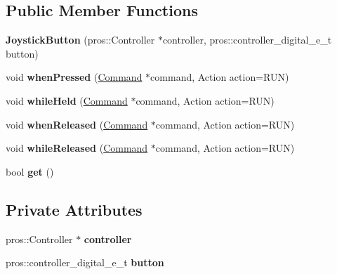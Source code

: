 \subsection*{Public Member Functions}
\begin{DoxyCompactItemize}
\item 
\mbox{\label{classlib_iterative_robot_1_1_joystick_button_af34169116bcab8a1b5868dddc745e5ec}} 
{\bfseries Joystick\+Button} (pros\+::\+Controller $\ast$controller, pros\+::controller\+\_\+digital\+\_\+e\+\_\+t button)
\item 
\mbox{\label{classlib_iterative_robot_1_1_joystick_button_ad3c08c71a1ccd81db8578bdbc10ff8f4}} 
void {\bfseries when\+Pressed} (\mbox{\hyperlink{classlib_iterative_robot_1_1_command}{Command}} $\ast$command, Action action=R\+UN)
\item 
\mbox{\label{classlib_iterative_robot_1_1_joystick_button_ac9e126abbcbf327f9390a82b7e953ec5}} 
void {\bfseries while\+Held} (\mbox{\hyperlink{classlib_iterative_robot_1_1_command}{Command}} $\ast$command, Action action=R\+UN)
\item 
\mbox{\label{classlib_iterative_robot_1_1_joystick_button_ac0d12fea8cd3fa4c25a2cd7eefaeef67}} 
void {\bfseries when\+Released} (\mbox{\hyperlink{classlib_iterative_robot_1_1_command}{Command}} $\ast$command, Action action=R\+UN)
\item 
\mbox{\label{classlib_iterative_robot_1_1_joystick_button_a36cb5b1a9c9277a2c4d1ef579e14dbe9}} 
void {\bfseries while\+Released} (\mbox{\hyperlink{classlib_iterative_robot_1_1_command}{Command}} $\ast$command, Action action=R\+UN)
\item 
\mbox{\label{classlib_iterative_robot_1_1_joystick_button_ab6f0b1d3362cc9ceae240712e8ef03a5}} 
bool {\bfseries get} ()
\end{DoxyCompactItemize}
\subsection*{Private Attributes}
\begin{DoxyCompactItemize}
\item 
\mbox{\label{classlib_iterative_robot_1_1_joystick_button_a092e3793ba078aff20f17b812345fbda}} 
pros\+::\+Controller $\ast$ {\bfseries controller}
\item 
\mbox{\label{classlib_iterative_robot_1_1_joystick_button_a505db434cba7b3ba8e57da5b09ab5efe}} 
pros\+::controller\+\_\+digital\+\_\+e\+\_\+t {\bfseries button}
\end{DoxyCompactItemize}
